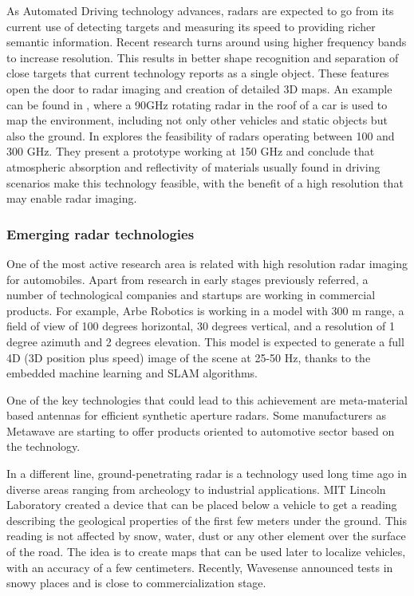 As Automated Driving technology advances, radars are expected to go from its
current use of detecting targets and measuring its speed to providing richer
semantic information. 
Recent research turns around using higher frequency bands to increase
resolution. This results in better shape recognition and separation of close
targets that current technology reports as a single object.
These features open the door to radar imaging and creation of detailed 3D maps. 
An example can be found in \cite{Reina2015}, where a 90GHz rotating radar in
the roof of a car is used to map the environment, including not only other
vehicles and static objects but also the ground.
In \cite{Kohler2013} explores the feasibility of radars operating between 
100 and 300 GHz. They present a prototype working at 150 GHz and conclude 
that atmospheric absorption and reflectivity of materials usually found in 
driving scenarios make this technology feasible, with the benefit of a high
resolution that may enable radar imaging.


\subsubsection{Emerging radar technologies}

One of the most active research area is related with high resolution radar
imaging for automobiles. Apart from research in early stages previously 
referred, a number of technological companies and startups are working in 
commercial products. 
For example, Arbe Robotics \cite{ArbeRobotics2018} is working in a 
model with 300 m range, a field of view of 100 degrees horizontal, 30 degrees
vertical, and a resolution of 1 degree azimuth and 2 degrees elevation. 
This model is expected to generate a full 4D (3D position plus speed) image of
the scene at 25-50 Hz, thanks to the embedded machine learning and SLAM
algorithms.

One of the key technologies that could lead to this achievement are 
meta-material based antennas \cite{Brookner2016,Sleasman2017} for efficient
synthetic aperture radars. 
Some manufacturers as Metawave \cite{Metawave2018} are starting 
to offer products oriented to automotive sector based on the technology.

In a different line, ground-penetrating radar is a technology used long
time ago in diverse areas ranging from archeology to industrial applications.
MIT Lincoln Laboratory created a device \cite{Cornick2016} that can be placed 
below a vehicle to get a reading describing the geological properties of the
first few meters under the ground. This reading is not affected by snow, 
water, dust or any other element over the surface of the road. The idea is to
create maps that can be used later to localize vehicles, with an accuracy of
a few centimeters. %
Recently, Wavesense \cite{WaveSense} announced tests in snowy places and is
close to commercialization stage.




